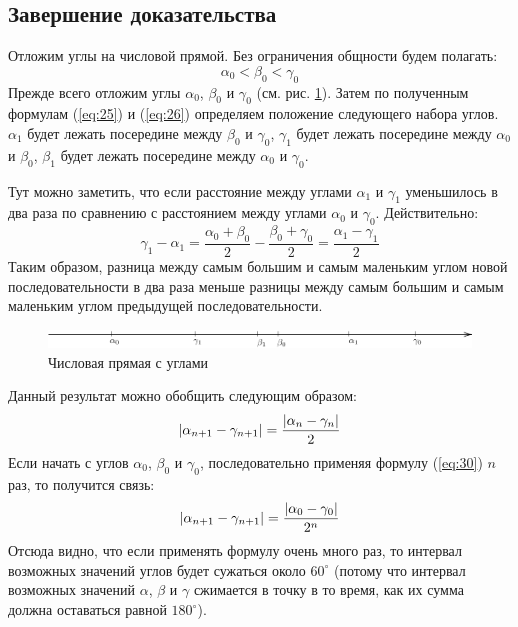 \documentclass[a4paper,9pt,russian]{article}
\begin{document}
\subsection{Завершение доказательства}
Отложим углы на числовой прямой. Без ограничения общности будем полагать:
\begin{equation}
	\alpha_0 < \beta_0 < \gamma_0
\end{equation}
Прежде всего отложим углы $\alpha_0$, $\beta_0$ и $\gamma_0$ (см. рис. \ref{fig:8}). Затем по полученным формулам (\ref{eq:25}) и (\ref{eq:26}) определяем положение следующего набора углов. $\alpha_1$ будет лежать посередине между $\beta_0$ и $\gamma_0$, $\gamma_1$ будет лежать посередине между $\alpha_0$ и $\beta_0$, $\beta_1$ будет лежать посередине между $\alpha_0$ и $\gamma_0$.
\par
Тут можно заметить, что если расстояние между углами $\alpha_1$ и $\gamma_1$ уменьшилось в два раза по сравнению с расстоянием между углами $\alpha_0$ и $\gamma_0$. Действительно:
\begin{equation}
	\gamma_1 - \alpha_1 = \dfrac{\alpha_0 + \beta_0}{2} - \dfrac{\beta_0 + \gamma_0}{2} = \dfrac{\alpha_1- \gamma_1 }{2}
\end{equation}
Таким образом, разница между самым большим и самым маленьким углом новой последовательности в два раза меньше разницы между самым большим и самым маленьким углом предыдущей последовательности.
\begin{figure}[h]
	\centering
	\includegraphics[scale = 1]{first7.pdf}
	\caption{Числовая прямая с углами}
	\label{fig:8}
\end{figure}
\par
Данный результат можно обобщить следующим образом:
\begin{equation}\label{eq:30}
	\abs{\alpha_{n+1} - \gamma_{n+1}} = \dfrac{\abs{\alpha_{n} - \gamma_{n}}}{2}
\end{equation}
Если начать с углов $\alpha_0$, $\beta_0$ и $\gamma_0$, последовательно применяя формулу (\ref{eq:30}) $n$ раз, то получится связь:
\begin{equation}
	\abs{\alpha_{n+1} - \gamma_{n+1}} = \dfrac{\abs{\alpha_{0} - \gamma_{0}}}{2^n}
\end{equation}
Отсюда видно, что если применять формулу очень много раз, то интервал возможных значений углов будет сужаться около $60^{\circ}$ (потому что интервал возможных значений $\alpha$, $\beta$ и $\gamma$ сжимается в точку в то время, как их сумма должна оставаться равной $180^{\circ}$).
\end{document}
